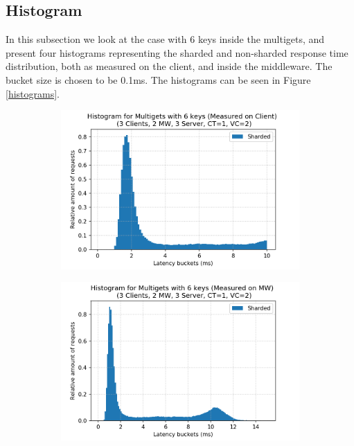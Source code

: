 \subsection{Histogram} \label{sub:hist}
In this subsection we  look at the case with 6 keys inside the multigets, and present four histograms representing the sharded and non-sharded response time distribution, both as measured on the client, and inside the middleware. The bucket size is chosen to be 0.1ms. The histograms can be seen in Figure \ref{histograms}.
\begin{figure}[ht]
        \centering
        \begin{subfigure}[b]{0.475\textwidth}
            \centering
            \includegraphics[width=\textwidth]{figures/4_GetsAndMultigets/mem_histogram_sharded_2018-11-22_18h12.png}
        \end{subfigure}
        \hfill
        \begin{subfigure}[b]{0.475\textwidth}  
            \centering 
            \includegraphics[width=\textwidth]{figures/4_GetsAndMultigets/mw_histogram_sharded_2018-11-22_18h12.png}

\end{subfigure}
\end{figure}
